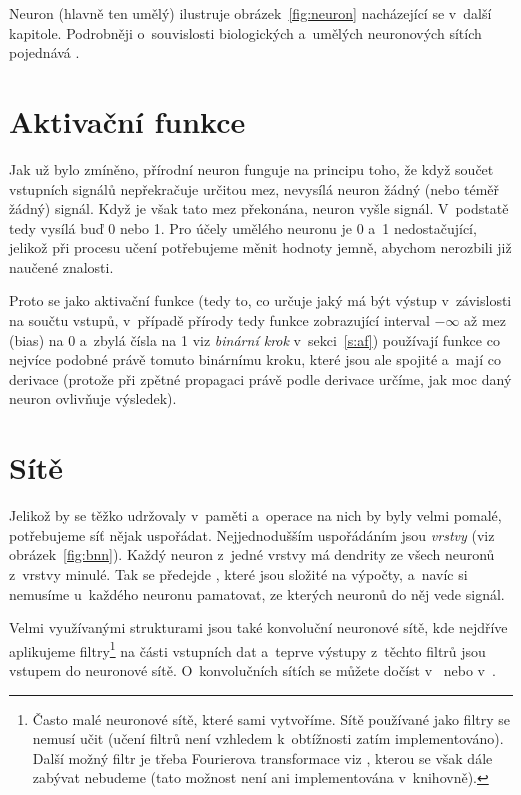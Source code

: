 \documentclass[12pt]{report}			%
\begin{document}
					Neuron (hlavně ten umělý) ilustruje obrázek~\ref{fig:neuron} nacházející se v~další kapitole. Podrobněji o~souvislosti biologických a~umělých neuronových sítích pojednává \autocite{book:BNN}.
				
				\section{Aktivační funkce}
					Jak už bylo zmíněno, přírodní neuron funguje na principu toho, že když součet vstupních signálů nepřekračuje určitou mez, nevysílá neuron žádný (nebo téměř žádný) signál. Když je však tato mez překonána, neuron vyšle signál. V~podstatě tedy vysílá buď 0 nebo 1. Pro účely umělého neuronu je 0 a~1 nedostačující, jelikož při procesu učení potřebujeme měnit hodnoty jemně, abychom nerozbili již naučené znalosti.
					
					Proto se jako aktivační funkce (tedy to, co určuje jaký má být výstup v~závislosti na součtu vstupů, v~případě přírody tedy funkce zobrazující interval $-\infty$ až mez (bias) na 0 a~zbylá čísla na 1 viz \emph{binární krok} v~sekci~\ref{s:af}) používají funkce co nejvíce podobné právě tomuto binárnímu kroku, které jsou ale spojité a~mají co  derivace (protože při zpětné propagaci právě podle derivace určíme, jak moc daný neuron ovlivňuje výsledek).
				
				\section{Sítě} \label{s:net}
					Jelikož  by se těžko udržovaly v~paměti a~operace na nich by byly velmi pomalé, potřebujeme síť nějak uspořádat. Nejjednodušším uspořádáním jsou \emph{vrstvy} (viz obrázek~\ref{fig:bnn}). Každý neuron z~jedné vrstvy má \gls{dendrit}y ze všech neuronů z~vrstvy minulé. Tak se předejde , které jsou složité na výpočty, a~navíc si nemusíme u~každého neuronu pamatovat, ze kterých neuronů do něj vede signál.
					
					Velmi využívanými strukturami jsou také konvoluční neuronové sítě, kde nejdříve aplikujeme filtry\footnote{Často malé neuronové sítě, které sami vytvoříme. Sítě používané jako filtry se nemusí učit (učení filtrů není vzhledem k~obtížnosti zatím implementováno). Další možný filtr je třeba Fourierova transformace viz \autocite{art:FCNN}, kterou se však dále zabývat nebudeme (tato možnost není ani implementována v~knihovně).} na části vstupních dat a~teprve výstupy z~těchto filtrů jsou vstupem do neuronové sítě. O~konvolučních sítích se můžete dočíst v~\autocite{lec:CNN} nebo v~\autocite{sem:CNN}.
					
\end{document}
